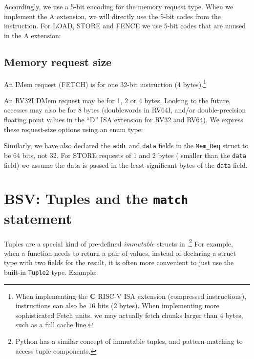Accordingly, we use a 5-bit encoding for the memory request type.
When we implement the A extension, we will directly use the 5-bit
codes from the instruction.  For LOAD, STORE and FENCE we use 5-bit
codes that are unused in the A extension:



\subsection{Memory request size}

\label{Sec_Mem_Req_Size}

An IMem request (FETCH) is for one 32-bit instruction (4
bytes).\footnote{When implementing the {\bf C} RISC-V ISA extension
(compressed instructions), instructions can also be 16 bits (2 bytes).
When implementing more sophisticated Fetch units, we may actually
fetch chunks larger than 4 bytes, such as a full cache line.}

An RV32I DMem request may be for 1, 2 or 4 bytes.  Looking to the
future, accesses may also be for 8 bytes (doublewords in RV64I, and/or
double-precision floating point values in the ``D'' ISA extension for
RV32 and RV64).  We express these request-size options using an enum
type:


Similarly, we have also declared the \verb|addr| and \verb|data|
fields in the \verb|Mem_Req| struct to be 64 bits, not 32.  For STORE
requests of 1 and 2 bytes ({\ie} smaller than the \verb|data| field)
we assume the data is passed in the least-significant bytes of the
\verb|data| field.


\section{BSV: Tuples and the {\tt match} statement}

\label{Sec_Tuples}


Tuples are a special kind of pre-defined \emph{immutable} structs in
{\BSV}.\footnote{
Python has a similar concept of immutable tuples, and pattern-matching
to access tuple components.
}
For example, when a function needs to return a pair of values, instead
of declaring a struct type with two fields for the result, it is often
more convenient to just use the built-in \verb|Tuple2| type.  Example:

